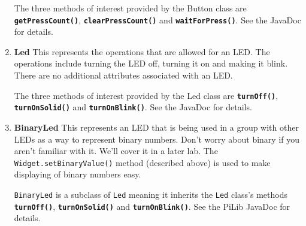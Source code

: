 \begin{enumerate}
	The three methods of interest provided by the Button class are \textbf{\texttt{getPressCount()}}, \textbf{\texttt{clearPressCount()}} and \textbf{\texttt{waitForPress()}}. See the JavaDoc for details.

	
	\item \textbf{Led} \newline
	This represents the operations that are allowed for an LED. The operations include turning the LED off, turning it on and making it blink. There are no additional attributes associated with an LED.
	
	The three methods of interest provided by the Led class are \textbf{\texttt{turnOff()}}, \textbf{\texttt{turnOnSolid()}} and \textbf{\texttt{turnOnBlink()}}. See the JavaDoc for details.
					
	
	\item \textbf{BinaryLed} \newline
	This represents an LED that is being used in a group
	with other LEDs as a way to represent binary numbers. Don't worry about binary if you aren't familiar with it. We'll cover it in a later lab. The \texttt{Widget.setBinaryValue()} method (described above) is used to make displaying of binary numbers easy.
	
	\texttt{BinaryLed} is a subclass of \texttt{Led} meaning it inherits the \texttt{Led} class's methods \textbf{\texttt{turnOff()}}, \textbf{\texttt{turnOnSolid()}} and \textbf{\texttt{turnOnBlink()}}. See the PiLib JavaDoc for details.
					
	
\end{enumerate}

